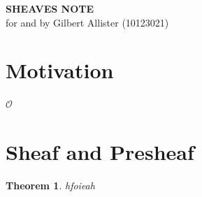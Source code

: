 \documentclass[12pt, a4paper]{article}
\newtheorem{theorem}{Theorem}[section]
\theoremstyle{definition}
\begin{document}
    \thispagestyle{firstpage}

    \begin{center}
        \vspace*{0.8cm}
        {\large\bfseries SHEAVES NOTE} \\[0.6cm]
        {\normalsize for and by Gilbert Allister (10123021)}
        \vspace*{0.8cm}
    \end{center}



    \section{Motivation}

    $\mathcal{O}$

    \section{Sheaf and Presheaf}
    \begin{theorem}
        hfoieah
    \end{theorem}
\end{document}

